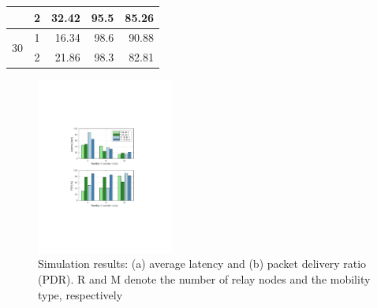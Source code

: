 \documentclass[conference]{IEEEtran}
\begin{document}
\begin{table}[]
\begin{tabular}{|c|c|r|r|r|}
                                                                                           & 2                                                                                 & 32.42                                    & 95.5                                              & 85.26                                                                                             \\ \hline
\multirow{2}{*}{30}                                                                        & 1                                                                                 & 16.34                                    & 98.6                                              & 90.88                                                                                             \\ \cline{2-5} 
                                                                                           & 2                                                                                 & 21.86                                    & 98.3                                              & 82.81                                                                                             \\ \hline
\end{tabular}
\end{table}

\begin{figure}
    \centering
    \includegraphics[trim= 150 200 150 200, clip, width=0.4\textwidth]{figure_barplot.pdf}
    \caption{Simulation results: (a) average latency and (b) packet delivery ratio (PDR). 
    R and M denote the number of relay nodes and the mobility type, respectively}
    \label{fig:results_bar}
\end{figure}
\end{document}
